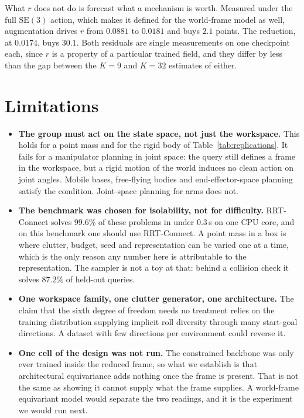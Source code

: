 \documentclass[10pt,twocolumn,letterpaper]{article}
\newcommand{\SE}{\mathrm{SE}(3)}
\begin{document}
What $r$ does not do is forecast what a mechanism is worth. Measured under the
full $\SE$ action, which makes it defined for the world-frame model as well,
augmentation drives $r$ from $0.0881$ to $0.0181$ and buys $2.1$ points. The
reduction, at $0.0174$, buys $30.1$. Both residuals are single measurements on
one checkpoint each, since $r$ is a property of a particular trained field, and
they differ by less than the gap between the $K{=}9$ and $K{=}32$ estimates of
either.


\section{Limitations}

\begin{itemize}\itemsep3pt
  \item \textbf{The group must act on the state space, not just the workspace.}
  This holds for a point mass and for the rigid body of Table~\ref{tab:replications}.
  It fails for a manipulator planning in joint space: the query still defines a
  frame in the workspace, but a rigid motion of the world induces no clean action
  on joint angles. Mobile bases, free-flying bodies and end-effector-space
  planning satisfy the condition. Joint-space planning for arms does not.

  \item \textbf{The benchmark was chosen for isolability, not for difficulty.}
  RRT-Connect solves $99.6\%$ of these problems in under $0.3$\,s on one CPU
  core, and on this benchmark one should use RRT-Connect. A point mass in a box
  is where clutter, budget, seed and representation can be varied one at a time,
  which is the only reason any number here is attributable to the representation.
  The sampler is not a toy at that: behind a collision check it solves $87.2\%$
  of held-out queries.

  \item \textbf{One workspace family, one clutter generator, one architecture.}
  The claim that the sixth degree of freedom needs no treatment relies on the
  training distribution supplying implicit roll diversity through many start-goal
  directions. A dataset with few directions per environment could reverse it.

  \item \textbf{One cell of the design was not run.} The constrained backbone
  was only ever trained inside the reduced frame, so what we establish is that
  architectural equivariance adds nothing once the frame is present. That is not
  the same as showing it cannot supply what the frame supplies. A world-frame
  equivariant model would separate the two readings, and it is the experiment we
  would run next.


\end{itemize}
\end{document}
